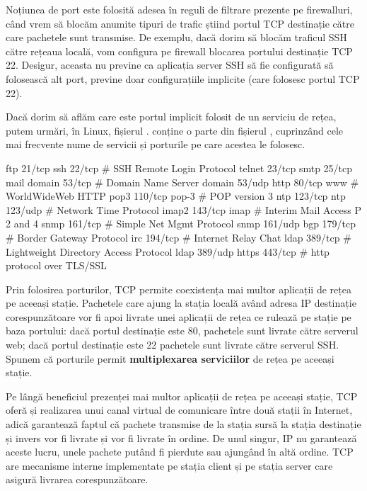 Noțiunea de port este folosită adesea în reguli de filtrare prezente pe firewalluri, când vrem să blocăm anumite tipuri de trafic știind portul TCP destinație către care pachetele sunt transmise.
De exemplu, dacă dorim să blocăm traficul SSH către rețeaua locală, vom configura pe firewall blocarea portului destinație TCP 22.
Desigur, aceasta nu previne ca aplicația server SSH să fie configurată să folosească alt port, previne doar configurațiile implicite (care folosesc portul TCP 22).

Dacă dorim să aflăm care este portul implicit folosit de un serviciu de rețea, putem urmări, în Linux, fișierul .
 conține o parte din fișierul , cuprinzând cele mai frecvente nume de servicii și porturile pe care acestea le folosesc.

\begin{screen}[caption={Servicii și porturi în Linux (fișierul /etc/services)},label={lst:net:etc-services}]
ftp		21/tcp
ssh		22/tcp				# SSH Remote Login Protocol
telnet		23/tcp
smtp		25/tcp		mail
domain		53/tcp				# Domain Name Server
domain		53/udp
http		80/tcp		www		# WorldWideWeb HTTP
pop3		110/tcp		pop-3		# POP version 3
ntp		123/tcp
ntp		123/udp				# Network Time Protocol
imap2		143/tcp		imap		# Interim Mail Access P 2 and 4
snmp		161/tcp				# Simple Net Mgmt Protocol
snmp		161/udp
bgp		179/tcp				# Border Gateway Protocol
irc		194/tcp				# Internet Relay Chat
ldap		389/tcp			# Lightweight Directory Access Protocol
ldap		389/udp
https		443/tcp				# http protocol over TLS/SSL
\end{screen}

Prin folosirea porturilor, TCP permite coexistența mai multor aplicații de rețea pe aceeași stație.
Pachetele care ajung la stația locală având adresa IP destinație corespunzătoare vor fi apoi livrate unei aplicații de rețea ce rulează pe stație pe baza portului: dacă portul destinație este 80, pachetele sunt livrate către serverul web; dacă portul destinație este 22 pachetele sunt livrate către serverul SSH.
Spunem că porturile permit \textbf{multiplexarea serviciilor} de rețea pe aceeași stație.

Pe lângă beneficiul prezenței mai multor aplicații de rețea pe aceeași stație, TCP oferă și realizarea unui canal virtual de comunicare între două stații în Internet, adică garantează faptul că pachete transmise de la stația sursă la stația destinație și invers vor fi livrate și vor fi livrate în ordine.
De unul singur, IP nu garantează aceste lucru, unele pachete putând fi pierdute sau ajungând în altă ordine.
TCP are mecanisme interne implementate pe stația client și pe stația server care asigură livrarea corespunzătoare.

